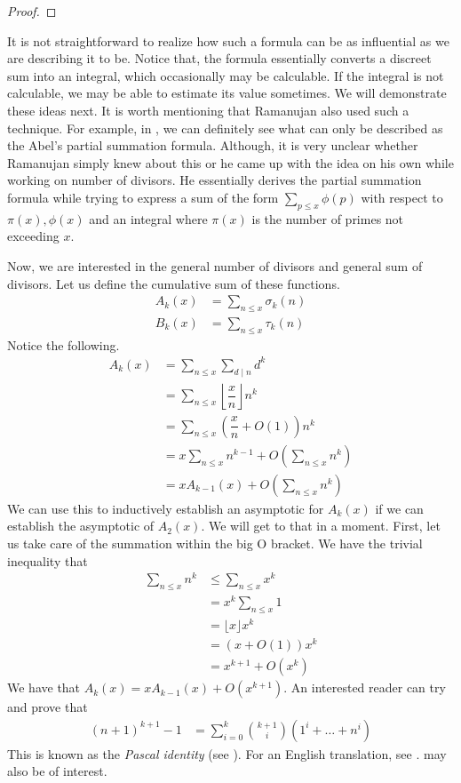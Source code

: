 \documentclass[elemannt.tex]{subfile}
\begin{document}
		\begin{proof}
			
		\end{proof}
	It is not straightforward to realize how such a formula can be as influential as we are describing it to be. Notice that, the formula essentially converts a discreet sum into an integral, which occasionally may be calculable. If the integral is not calculable, we may be able to estimate its value sometimes. We will demonstrate these ideas next. It is worth mentioning that Ramanujan also used such a technique. For example, in \textcite[Page $83$, $\S4$]{aiyangar_hardy_vennkatesvara_seshu_aiyar_p_wilson_1927}, we can definitely see what can only be described as the Abel's partial summation formula. Although, it is very unclear whether Ramanujan simply knew about this or he came up with the idea on his own while working on number of divisors. He essentially derives the partial summation formula while trying to express a sum of the form $\sum_{p\leq x}\phi(p)$ with respect to $\pi(x),\phi(x)$ and an integral where $\pi(x)$ is the number of primes not exceeding $x$.
	
	Now, we are interested in the general number of divisors and general sum of divisors. Let us define the cumulative sum of these functions.
		\begin{align*}
			A_{k}(x)
				& = \sum_{n\leq x}\sigma_{k}(n)\\
			B_{k}(x)
				& = \sum_{n\leq x}\tau_{k}(n)
		\end{align*}
	Notice the following.
		\begin{align*}
			A_{k}(x)
				& = \sum_{n\leq x}\sum_{d\mid n}d^{k}\\
				& = \sum_{n\leq x}\left\lfloor{\dfrac{x}{n}}\right\rfloor n^{k}\\
				& = \sum_{n\leq x}\left(\dfrac{x}{n}+O(1)\right)n^{k}\\
				& = x\sum_{n\leq x}n^{k-1}+O\left(\sum_{n\leq x}n^{k}\right)\\
				& = xA_{k-1}(x)+O\left(\sum_{n\leq x}n^{k}\right)
		\end{align*}
	We can use this to inductively establish an asymptotic for $A_{k}(x)$ if we can establish the asymptotic of $A_{2}(x)$. We will get to that in a moment. First, let us take care of the summation within the big O bracket. We have the trivial inequality that
		\begin{align*}
			\sum_{n\leq x}n^{k}
				& \leq \sum_{n\leq x}x^{k}\\
				& = x^{k}\sum_{n\leq x}1\\
				& = \lfloor{x}\rfloor x^{k}\\
				& = (x+O(1))x^{k}\\
				& = x^{k+1}+O(x^{k})
		\end{align*}
	We have that $A_{k}(x)=xA_{k-1}(x)+O(x^{k+1})$. An interested reader can try and prove that
		\begin{align*}
			(n+1)^{k+1}-1
				& =\sum_{i=0}^{k}\binom{k+1}{i}(1^{i}+\ldots+n^{i})
		\end{align*}
	This is known as the \textit{Pascal identity} (see \textcite{pascal_1964}). For an English translation, see \textcite{knoebel_laubenbacher_lodder_pengelley_2007}.  \textcite{kieren_macmillan_jonathan_sondow_2011} may also be of interest.
\end{document}
